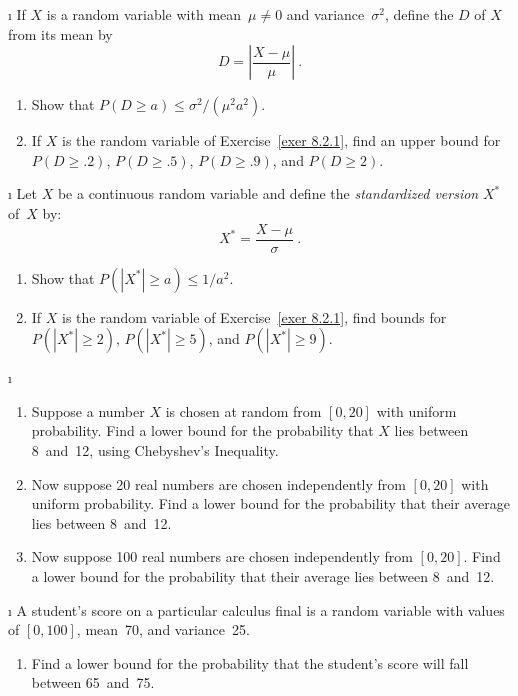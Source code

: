 {\begin{LJSItem}
\i\label{exer 8.2.103} If $X$ is a random variable with mean~$\mu \ne 0$ and variance~$\sigma^2$,
define the  $D$ of $X$ from its mean by
$$
D = \left| \frac {X - \mu}\mu \right|\ .
$$
\begin{enumerate}
\item Show that $P(D \geq a) \leq \sigma^2/(\mu^2a^2)$.

\item If $X$ is the random variable of Exercise~\ref{exer 8.2.1}, find an
upper bound for $P(D \geq .2)$, $P(D \geq .5)$, $P(D \geq .9)$, and $P(D \geq
2)$.
\end{enumerate}

\i\label{exer 8.2.104} Let $X$ be a continuous random variable and define the {\em
standardized version} $X^*$ of~$X$ by:
$$
X^* = \frac {X - \mu}\sigma\ .
$$
\begin{enumerate}
\item Show that $P(|X^*| \geq a) \leq 1/a^2$.

\item If $X$ is the random variable of Exercise~\ref{exer 8.2.1}, find
bounds for $P(|X^*| \geq 2)$, $P(|X^*| \geq 5)$, and $P(|X^*| \geq 9)$.
\end{enumerate}

\i\label{exer 8.2.105}
\begin{enumerate} 
\item Suppose a number $X$ is chosen at random from $[0,20]$ with uniform
probability.  Find a lower bound for the probability that $X$ lies between
8~and~12, using Chebyshev's Inequality.

\item Now suppose 20 real numbers are chosen independently from $[0,20]$
with uniform probability.  Find a lower bound for the probability that their
average lies between 8~and~12.

\item Now suppose 100 real numbers are chosen independently from
$[0,20]$.  Find a lower bound for the probability that their average lies
between 8~and~12.
\end{enumerate}

\i\label{exer 8.2.106} A student's score on a particular calculus final is a random variable
with values of $[0,100]$, mean~70, and variance~25.
\begin{enumerate}
\item Find a lower bound for the probability that the student's score will
fall between 65~and~75.


\end{enumerate}
\end{LJSItem}}
